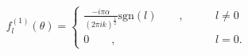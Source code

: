\begin{equation}
f_{l}^{\left( 1\right) }\left( \theta \right) =\left\{
\begin{array}{cl}
\frac{-i\pi \alpha }{\left( 2\pi ik\right) ^{\frac{1}{2}}} \mathrm{sgn}(l) \qquad ,\qquad
&l \neq 0 \\
0\qquad ,\qquad &l=0.
\end{array}
\right.
\label{eq12}
\end{equation}

